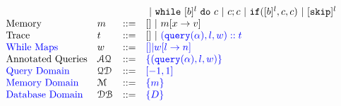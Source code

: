 \documentclass[a4paper,11pt]{article}
\begin{document}
\[\begin{array}{llll}
 	& & & ~|~  \ewhile ~ [b]^l ~ \edo ~ c  ~|~ c;c  ~|~ \eif([\bexpr]^l, c, c) 	 ~|~ [\eskip]^{l} 
 \\
\mbox{Memory} & m & ::= & [] ~|~ m[x \to v] \\
\mbox{Trace} & t & ::= & [] 
~|~ \jl{{( \query(\qval), l, w) :: t}} \\
%
\mbox{\jl{While Maps}}
& w & ::= & \jl{[] |  w[l \to n]}
\\
%
\mbox{Annotated Queries} & \mathcal{AQ}  & 
::= & \jl{\{( \query(\qval), l, w) \} } 
\\
%
\mbox{\jl{Query Domain}}
& \qdom & ::= & \jl{[-1,1]}
\\
%
\mbox{\jl{Memory Domain}}
& \memdom & ::= & \jl{\{m\}}
\\
%
\mbox{\jl{Database Domain}}
& \dbdom & ::= & \jl{\{D\}}
\end{array}
\]
%
%
\end{document}
